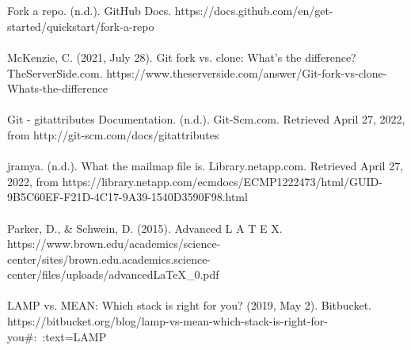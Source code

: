 \documentclass[a4paper, 11pt]{report}
\begin{document}
    \\
    \\
    Fork a repo. (n.d.). GitHub Docs. https://docs.github.com/en/get-started/quickstart/fork-a-repo
    \\
    \\
    McKenzie, C. (2021, July 28). Git fork vs. clone: What’s the difference? TheServerSide.com. https://www.theserverside.com/answer/Git-fork-vs-clone-Whats-the-difference
    \\
    \\
    Git - gitattributes Documentation. (n.d.). Git-Scm.com. Retrieved April 27, 2022, from http://git-scm.com/docs/gitattributes
    \\
    \\
    jramya. (n.d.). What the mailmap file is. Library.netapp.com. Retrieved April 27, 2022, from https://library.netapp.com/ecmdocs/ECMP1222473/html/GUID-9B5C60EF-F21D-4C17-9A39-1540D3590F98.html
    \\
    \\
    Parker, D., & Schwein, D. (2015). Advanced L A T E X. https://www.brown.edu/academics/science-center/sites/brown.edu.academics.science-center/files/uploads/advancedLaTeX_0.pdf
	\\
	\\
	LAMP vs. MEAN: Which stack is right for you? (2019, May 2). Bitbucket. https://bitbucket.org/blog/lamp-vs-mean-which-stack-is-right-for-you#:~:text=LAMP%
	
	
\end{document}
